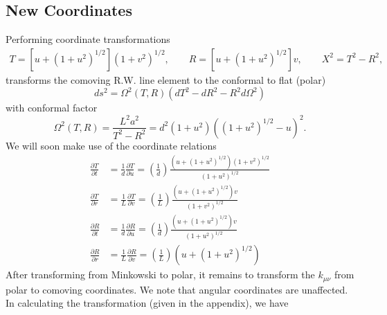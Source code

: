 \documentclass[10pt,letterpaper]{article}
\begin{document}
\subsection*{New Coordinates}
Performing coordinate transformations
\begin{align}
T = \left[u+(1+u^2)^{1/2}\right]( 1+v^2)^{1/2},\qquad R = \left[u+(1+u^2)^{1/2}\right]v,\qquad X^2 = T^2-R^2,
\end{align}
transforms the comoving R.W. line element to the conformal to flat (polar)
\begin{equation}
ds^2 = \Omega^2(T,R)(dT^2 - dR^2 - R^2 d\Omega^2)
\end{equation}
with conformal factor
\begin{equation}
\Omega^2(T,R) = \frac{L^2 a^2}{T^2-R^2} = d^2(1+u^2)((1+u^2)^{1/2}-u)^2.
\end{equation}
We will soon make use of the coordinate relations
\begin{align}
\frac{\partial T}{\partial t} &= \frac{1}{d}\frac{\partial T}{\partial u} = \left(\frac1d\right)\frac{(u+(1+u^2)^{1/2})(1+v^2)^{1/2}}{(1+u^2)^{1/2}}\nonumber\\
\frac{\partial T}{\partial r} &= \frac{1}{L}\frac{\partial T}{\partial v} =   \left(\frac1L\right)\frac{(u+(1+u^2)^{1/2})v}{(1+v^2)^{1/2}}\nonumber\\
\frac{\partial R}{\partial t} &= \frac{1}{d}\frac{\partial R}{\partial u} =   \left(\frac1d\right)\frac{(u+(1+u^2)^{1/2})v}{(1+u^2)^{1/2}}\nonumber\\
\frac{\partial R}{\partial r} &= \frac{1}{L}\frac{\partial R}{\partial v} = \left(\frac1L\right)( u+(1+u^2)^{1/2})
\end{align}
After transforming from Minkowski to polar, it remains to transform the $k_{\mu\nu}$ from polar to comoving coordinates. We note that angular coordinates are unaffected. In calculating the transformation (given in the appendix), we have
\end{document}
